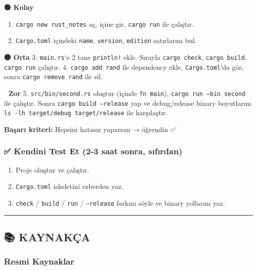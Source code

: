 \documentclass[12pt,a4paper]{article}
\begin{document}
\textbf{🟢 Kolay}

\begin{enumerate}
\def\labelenumi{\arabic{enumi}.}
\tightlist
\item
  \texttt{cargo\ new\ rust\_notes} aç, içine gir, \texttt{cargo\ run} ile çalıştır.
\item
  \texttt{Cargo.toml} içindeki \texttt{name}, \texttt{version}, \texttt{edition} satırlarını bul.
\end{enumerate}

\textbf{🟡 Orta}
3. \texttt{main.rs}`e 2 tane \texttt{println!} ekle. Sırayla \texttt{cargo\ check}, \texttt{cargo\ build}, \texttt{cargo\ run} çalıştır.
4. \texttt{cargo\ add\ rand} ile dependency ekle, \texttt{Cargo.toml}`da gör, sonra \texttt{cargo\ remove\ rand} ile sil.

\textbf{🔴 Zor}
5. \texttt{src/bin/second.rs} oluştur (içinde \texttt{fn\ main}), \texttt{cargo\ run\ --bin\ second} ile çalıştır. Sonra \texttt{cargo\ build\ --release} yap ve debug/release binary boyutlarını \texttt{ls\ -lh\ target/debug\ target/release} ile karşılaştır.

\textbf{Başarı kriteri:} Hepsini hatasız yaparsan → öğrendin ✅

\subsubsection{✅ Kendini Test Et (2-3 saat sonra, sıfırdan)}\label{kendini-test-et-2-3-saat-sonra-sıfırdan}

\begin{enumerate}
\def\labelenumi{\arabic{enumi}.}
\tightlist
\item
  Proje oluştur ve çalıştır.
\item
  \texttt{Cargo.toml} iskeletini ezberden yaz.
\item
  \texttt{check} / \texttt{build} / \texttt{run} / \texttt{--release} farkını söyle ve binary yollarını yaz.
\end{enumerate}

\begin{center}\rule{0.5\linewidth}{0.5pt}\end{center}

\subsection{📚 KAYNAKÇA}\label{kaynakça}

\subsubsection{Resmi Kaynaklar}\label{resmi-kaynaklar}
\end{document}
